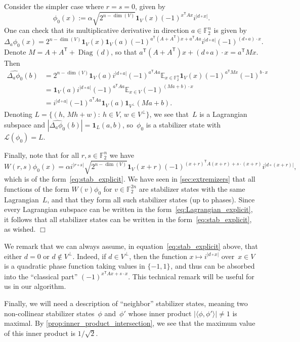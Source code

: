 \documentclass[11pt]{amsart}
\newcommand{\E}{\mathbb{E}}
\newcommand{\F}{\mathbb{F}} %
\newcommand{\Lcal}{\mathcal{L}}
\newcommand{\pmset}[1]{\{-1,1\}^{#1}} %
\newcommand{\one}{\mathbf{1}}
\DeclareMathOperator{\Diag}{Diag}
\newcommand{\tp}{\mathsf{T}}
\theoremstyle{plain}
\theoremstyle{definition}
\theoremstyle{remark}
\renewenvironment{proof}[1][]{
    	\begin{trivlist}
     	\item[\hspace{\labelsep}{\em\noindent Proof#1:\/}]}
     	{{\hfill$\Box$}
    	\end{trivlist}
  }
\begin{document}
\begin{proof}
Consider the simpler case where $r=s=0$, given by
$$\phi_0(x) := \alpha \sqrt{2^{n-\dim(V)}} \one_V(x) (-1)^{x^\tp Ax} i^{|d\circ x|}.$$
One can check that its multiplicative derivative in direction $a\in \F_2^n$ is given by
\begin{equation*}
    \Delta_a \phi_0(x)
    = 2^{n-\dim(V)} \one_V(x) \one_V(a) (-1)^{a^\tp (A+A^\tp)x + a^\tp Aa} i^{|d\circ a|} (-1)^{(d\circ a)\cdot x}.
\end{equation*}
Denote $M = A+A^\tp + \Diag(d)$, so that $a^\tp (A+A^\tp)x + (d\circ a)\cdot x = a^\tp Mx$.
Then
\begin{align*}
    \widehat{\Delta_a \phi_0}(b)
    &= 2^{n-\dim(V)} \one_V(a) i^{|d\circ a|} (-1)^{a^\tp Aa} \E_{x\in \F_2^n} \one_V(x) (-1)^{a^\tp Mx} (-1)^{b\cdot x} \\
    &= \one_V(a) i^{|d\circ a|} (-1)^{a^\tp Aa} \E_{x\in V} (-1)^{(Ma+b) \cdot x} \\
    &= i^{|d\circ a|} (-1)^{a^\tp Aa} \one_V(a) \one_{V^\perp}(Ma+b).
\end{align*}
Denoting
$L = \big\{(h,\, Mh+w):\: h\in V,\, w\in V^\perp\big\}$,
we see that~$L$ is a Lagrangian subspace and $|\widehat{\Delta_a \phi_0}(b)| = \one_L(a,b)$, so~$\phi_0$ is a stabilizer state with $\Lcal(\phi_0) = L$.

Finally, note that for all $r, s \in \F_2^n$ we have
$$W(r,s) \phi_0(x) = \alpha i^{|r\circ s|} \sqrt{2^{n-\dim(V)}} \one_V(x+r) (-1)^{(x+r)^\tp A(x+r) + s\cdot(x+r)} i^{|d\circ (x+r)|},$$
which is of the form~\eqref{eq:stab_explicit}.
We have seen in \cref{sec:extremizers} that all functions of the form $W(v)\phi_0$ for $v\in \F_2^{2n}$ are stabilizer states with the same Lagrangian~$L$, and that they form all such stabilizer states (up to phases).
Since every Lagrangian subspace can be written in the form~\eqref{eq:Lagrangian_explicit}, it follows that all stabilizer states can be written in the form~\eqref{eq:stab_explicit}, as wished.
\end{proof}

We remark that we can always assume, in equation~\eqref{eq:stab_explicit} above, that either $d=0$ or $d\notin V^\perp$.
Indeed, if $d\in V^{\perp}$, then the function $x \mapsto i^{|d\circ x|}$ over~$x\in V$ is a quadratic phase function taking values in $\pmset{}$, and thus can be absorbed into the ``classical part'' $(-1)^{x^\tp Ax + s\cdot x}$.
This technical remark will be useful for us in our algorithm.

Finally, we will need a description of ``neighbor'' stabilizer states, meaning two non-collinear stabilizer states~$\phi$ and~$\phi'$ whose inner product $|\langle\phi, \phi'\rangle| \neq 1$ is maximal.
By \cref{prop:inner_product_intersection}, we see that the maximum value of this inner product is $1/\sqrt{2}$.
\end{document}
